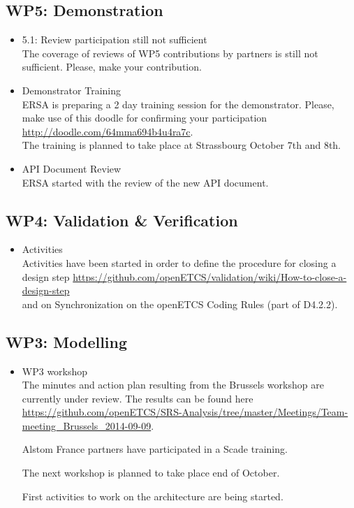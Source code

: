 \documentclass[a4paper, 11pt]{article}
\begin{document}
\subsection{WP5: Demonstration}
\begin{itemize}
\item 5.1: Review participation still not sufficient\\
The coverage of reviews of WP5 contributions by partners is still not sufficient. Please, make your contribution.
\item Demonstrator Training\\
ERSA is preparing a 2 day training session for the demonstrator. Please, make use of this doodle for confirming your participation \url{http://doodle.com/64mma694b4u4ra7c}.\\
The training is planned to take place at Strassbourg October 7th and 8th.
\item API Document Review\\
ERSA started with the review of the new API document.

\end{itemize}

\subsection{WP4: Validation \& Verification}
\begin{itemize}

\item Activities\\
Activities have been started in order to define the procedure for closing a design step \url{https://github.com/openETCS/validation/wiki/How-to-close-a-design-step} \\ and on Synchronization on the openETCS Coding Rules (part of D4.2.2).
\end{itemize}

\subsection{WP3: Modelling}
\begin{itemize}

\item WP3 workshop\\
The minutes and action plan resulting from the Brussels workshop are currently under review. The results can be found here \url{https://github.com/openETCS/SRS-Analysis/tree/master/Meetings/Team-meeting_Brussels_2014-09-09}.

Alstom France partners have participated in a Scade training.

The next workshop is planned to take place end of October.

First activities to work on the architecture are being started.

\end{itemize}
\end{document}
